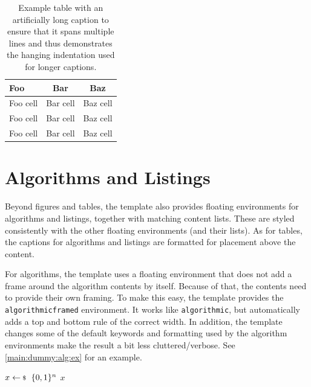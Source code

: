 \begin{table}
  \centering
  \caption{Example table with an artificially long caption to ensure that it
  spans multiple lines and thus demonstrates the hanging indentation used for
  longer captions.}
  \label{main:dummy:tab:ex}
  \begin{tabular}{lcc}
    \toprule
    Foo & Bar & Baz  \\
    \midrule
    Foo cell & Bar cell & Baz cell \\
    Foo cell & Bar cell & Baz cell \\
    Foo cell & Bar cell & Baz cell \\
    \bottomrule
  \end{tabular}
\end{table}

\section{Algorithms and Listings}\label{main:dummy:alglst}

Beyond figures and tables, the template also provides floating environments for
algorithms and listings, together with matching content lists. These are styled
consistently with the other floating environments (and their lists). As
for tables, the captions for algorithms and listings are formatted
for placement above the content.

For algorithms, the template uses a floating environment that does not add a
frame around the algorithm contents by itself. Because of that, the contents
need to provide their own framing. To make this easy, the template provides the
\verb|algorithmicframed| environment. It works like \verb|algorithmic|, but
automatically adds a top and bottom rule of the correct width. In addition, the
template changes some of the default keywords and formatting used by the
algorithm environments make the result a bit less cluttered/verbose. See
\cref{main:dummy:alg:ex} for an example.

\begin{algorithm}
  \centering
  \caption{Example algorithm.}
  \label{main:dummy:alg:ex}
  \begin{algorithmicframed}[1]
      \State \(x \sample \{0,1\}^n\) 
    \EndFor
    \State \Return \(x\) 
    \EndProcedure
  \end{algorithmicframed}
\end{algorithm}

